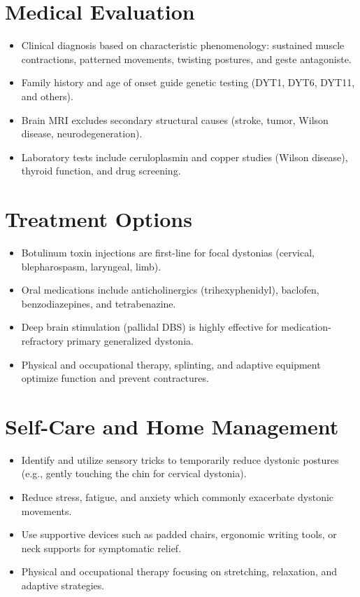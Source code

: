 \section*{Medical Evaluation}
\begin{itemize}
  \item Clinical diagnosis based on characteristic phenomenology: sustained muscle contractions, patterned movements, twisting postures, and geste antagoniste.
  \item Family history and age of onset guide genetic testing (DYT1, DYT6, DYT11, and others).
  \item Brain MRI excludes secondary structural causes (stroke, tumor, Wilson disease, neurodegeneration).
  \item Laboratory tests include ceruloplasmin and copper studies (Wilson disease), thyroid function, and drug screening.
\end{itemize}

\section*{Treatment Options}
\begin{itemize}
  \item Botulinum toxin injections are first-line for focal dystonias (cervical, blepharospasm, laryngeal, limb).
  \item Oral medications include anticholinergics (trihexyphenidyl), baclofen, benzodiazepines, and tetrabenazine.
  \item Deep brain stimulation (pallidal DBS) is highly effective for medication-refractory primary generalized dystonia.
  \item Physical and occupational therapy, splinting, and adaptive equipment optimize function and prevent contractures.
\end{itemize}

\section*{Self-Care and Home Management}
\begin{itemize}
  \item Identify and utilize sensory tricks to temporarily reduce dystonic postures (e.g., gently touching the chin for cervical dystonia).
  \item Reduce stress, fatigue, and anxiety which commonly exacerbate dystonic movements.
  \item Use supportive devices such as padded chairs, ergonomic writing tools, or neck supports for symptomatic relief.
  \item Physical and occupational therapy focusing on stretching, relaxation, and adaptive strategies.
\end{itemize}

